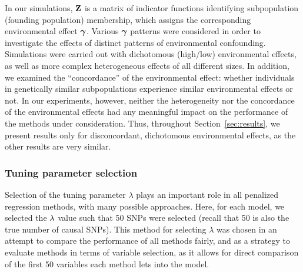 In our simulations, $\mathbf{Z}$ is a matrix of indicator functions identifying subpopulation (founding population) membership, which assigns the corresponding environmental effect $\boldsymbol{\gamma}$. Various $\boldsymbol{\gamma}$ patterns were considered in order to investigate the effects of distinct patterns of environmental confounding.  Simulations were carried out with dichotomous (high/low) environmental effects, as well as more complex heterogeneous effects of all different sizes.  In addition, we examined the ``concordance'' of the environmental effect: whether individuals in genetically similar subpopulations experience similar environmental effects or not.  In our experiments, however, neither the heterogeneity nor the concordance of the environmental effects had any meaningful impact on the performance of the methods under consideration.  Thus, throughout Section~\ref{sec:results}, we present results only for disconcordant, dichotomous environmental effects, as the other results are very similar.


\subsubsection{Tuning parameter selection}

Selection of the tuning parameter $\lambda$ plays an important role in all penalized regression methods, with many possible approaches. Here, for each model, we selected the $\lambda$ value such that 50 SNPs were selected (recall that 50 is also the true number of causal SNPs). This method for selecting $\lambda$ was chosen in an attempt to compare the performance of all methods fairly, and as a strategy to evaluate methods in terms of variable selection, as it allows for direct comparison of the first 50 variables each method lets into the model.

